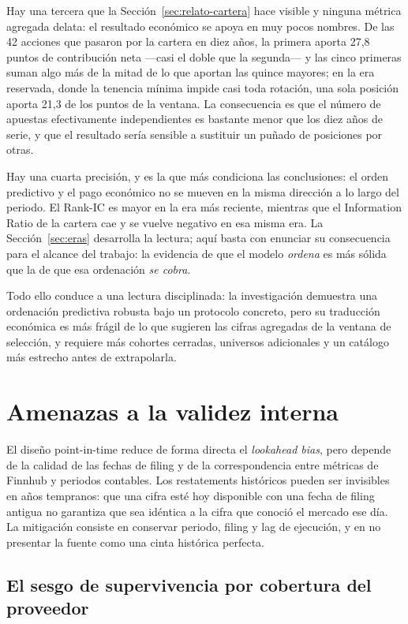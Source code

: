 Hay una tercera que la Sección~\ref{sec:relato-cartera} hace visible y ninguna métrica agregada
delata: el resultado económico se apoya en muy pocos nombres. De las 42 acciones que pasaron por la
cartera en diez años, la primera aporta 27,8 puntos de contribución neta ---casi el doble que la
segunda--- y las cinco primeras suman algo más de la mitad de lo que aportan las quince mayores; en
la era reservada, donde la tenencia mínima impide casi toda rotación, una sola posición aporta 21,3
de los puntos de la ventana. La consecuencia es que el
número de apuestas efectivamente independientes es bastante menor que los diez años de serie, y que
el resultado sería sensible a sustituir un puñado de posiciones por otras.

Hay una cuarta precisión, y es la que más condiciona las conclusiones: el orden predictivo y el
pago económico no se mueven en la misma dirección a lo largo del periodo. El Rank-IC es mayor en la
era más reciente, mientras que el Information Ratio de la cartera cae y se vuelve negativo en esa
misma era. La Sección~\ref{sec:eras} desarrolla la lectura; aquí basta con enunciar su consecuencia
para el alcance del trabajo: la evidencia de que el modelo \emph{ordena} es más sólida que la de que
esa ordenación \emph{se cobra}.

Todo ello conduce a una lectura disciplinada: la investigación demuestra una ordenación predictiva
robusta bajo un protocolo concreto, pero su traducción económica es más frágil de lo que sugieren
las cifras agregadas de la ventana de selección, y requiere más cohortes cerradas, universos
adicionales y un catálogo más estrecho antes de extrapolarla.

\section{Amenazas a la validez interna}

El diseño point-in-time reduce de forma directa el \textit{lookahead bias}, pero depende de la
calidad de las fechas de filing y de la correspondencia entre métricas de Finnhub y periodos
contables. Los restatements históricos pueden ser invisibles en años tempranos: que una cifra esté
hoy disponible con una fecha de filing antigua no garantiza que sea idéntica a la cifra que conoció
el mercado ese día. La mitigación consiste en conservar periodo, filing y lag de ejecución, y en no
presentar la fuente como una cinta histórica perfecta.

\subsection*{El sesgo de supervivencia por cobertura del proveedor}


